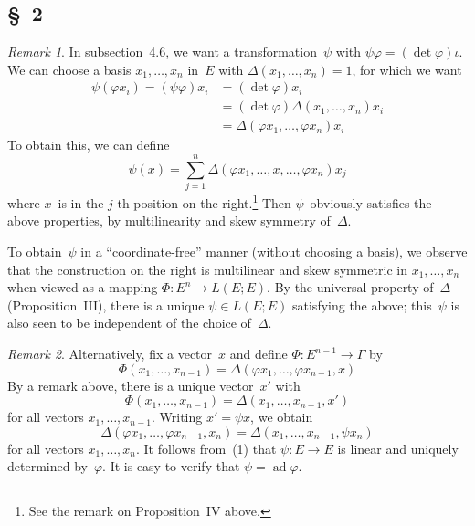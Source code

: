 \documentclass[letterpaper,12pt]{article}
\DeclareMathOperator{\ad}{ad}
\theoremstyle{definition}
\theoremstyle{remark}
\newtheorem*{rmk}{Remark}
\begin{document}
\subsection*{\S~2}
\begin{rmk}
In subsection~4.6, we want a transformation~\(\psi\) with \(\psi\varphi=(\det\varphi)\iota\). We can choose a basis \(x_1,\ldots,x_n\) in~\(E\) with \(\Delta(x_1,\ldots,x_n)=1\), for which we want
\begin{align*}
\psi(\varphi x_i)=(\psi\varphi)x_i&=(\det\varphi)x_i\\
	&=(\det\varphi)\Delta(x_1,\ldots,x_n)x_i\\
	&=\Delta(\varphi x_1,\ldots,\varphi x_n)x_i
\end{align*}
To obtain this, we can define
\[\psi(x)=\sum_{j=1}^n\Delta(\varphi x_1,\ldots,x,\ldots,\varphi x_n)x_j\]
where \(x\)~is in the \(j\)-th position on the right.\footnote{See the remark on Proposition~IV above.} Then \(\psi\)~obviously satisfies the above properties, by multilinearity and skew symmetry of~\(\Delta\).

To obtain~\(\psi\) in a ``coordinate-free''  manner (without choosing a basis), we observe that the construction on the right is multilinear and skew symmetric in \(x_1,\ldots,x_n\) when viewed as a mapping \(\Phi:E^n\to L(E;E)\). By the universal property of~\(\Delta\) (Proposition~III), there is a unique \(\psi\in L(E;E)\) satisfying the above; this~\(\psi\) is also seen to be independent of the choice of~\(\Delta\).
\end{rmk}

\begin{rmk}
Alternatively, fix a vector~\(x\) and define \(\Phi:E^{n-1}\to\Gamma\) by
\[\Phi(x_1,\ldots,x_{n-1})=\Delta(\varphi x_1,\ldots,\varphi x_{n-1},x)\]
By a remark above, there is a unique vector~\(x'\) with
\[\Phi(x_1,\ldots,x_{n-1})=\Delta(x_1,\ldots,x_{n-1},x')\]
for all vectors \(x_1,\ldots,x_{n-1}\). Writing \(x'=\psi x\), we obtain
\[\Delta(\varphi x_1,\ldots,\varphi x_{n-1},x_n)=\Delta(x_1,\ldots, x_{n-1},\psi x_n)\tag{1}\]
for all vectors \(x_1,\ldots,x_n\). It follows from~(1) that \(\psi:E\to E\) is linear and uniquely determined by~\(\varphi\). It is easy to verify that \(\psi=\ad\varphi\).
\end{rmk}
\end{document}
